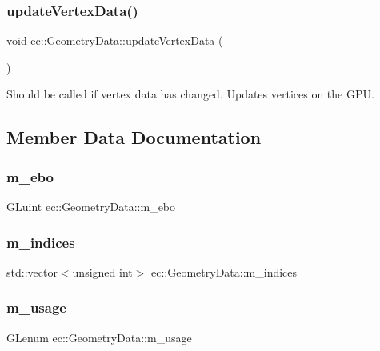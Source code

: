 \subsubsection{\texorpdfstring{update\+Vertex\+Data()}{updateVertexData()}}
{\footnotesize\ttfamily void ec\+::\+Geometry\+Data\+::update\+Vertex\+Data (\begin{DoxyParamCaption}{ }\end{DoxyParamCaption})}

Should be called if vertex data has changed. Updates vertices on the G\+PU. 

\subsection{Member Data Documentation}
\mbox{\label{structec_1_1_geometry_data_a9a982abc1fed3a4797a5353dec4feb16}} 
\subsubsection{\texorpdfstring{m\+\_\+ebo}{m\_ebo}}
{\footnotesize\ttfamily G\+Luint ec\+::\+Geometry\+Data\+::m\+\_\+ebo}

\mbox{\label{structec_1_1_geometry_data_ab32858fa60eb5c6859c287d00b14357d}} 
\subsubsection{\texorpdfstring{m\+\_\+indices}{m\_indices}}
{\footnotesize\ttfamily std\+::vector$<$unsigned int$>$ ec\+::\+Geometry\+Data\+::m\+\_\+indices}

\mbox{\label{structec_1_1_geometry_data_ab2cb1a359dabc5cad9d41cf0f8121d95}} 
\subsubsection{\texorpdfstring{m\+\_\+usage}{m\_usage}}
{\footnotesize\ttfamily G\+Lenum ec\+::\+Geometry\+Data\+::m\+\_\+usage}

